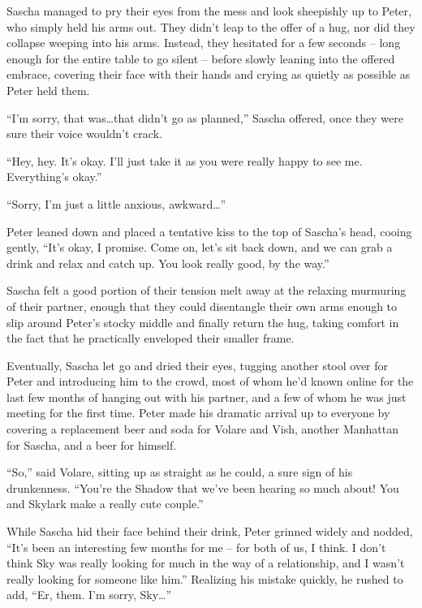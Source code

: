 \documentclass[12pt,letterpaper,oneside]{memoir}
\begin{document}
  Sascha managed to pry their eyes from the mess and look sheepishly up to Peter, who simply held his arms out. They didn't leap to the offer of a hug, nor did they collapse weeping into his arms. Instead, they hesitated for a few seconds -- long enough for the entire table to go silent -- before slowly leaning into the offered embrace, covering their face with their hands and crying as quietly as possible as Peter held them.

  ``I'm sorry, that was\ldots{}that didn't go as planned,'' Sascha offered, once they were sure their voice wouldn't crack.

  ``Hey, hey. It's okay. I'll just take it as you were really happy to see me. Everything's okay.''

  ``Sorry, I'm just a little anxious, awkward\ldots{}''

  Peter leaned down and placed a tentative kiss to the top of Sascha's head, cooing gently, ``It's okay, I promise. Come on, let's sit back down, and we can grab a drink and relax and catch up. You look really good, by the way.''

  Sascha felt a good portion of their tension melt away at the relaxing murmuring of their partner, enough that they could disentangle their own arms enough to slip around Peter's stocky middle and finally return the hug, taking comfort in the fact that he practically enveloped their smaller frame.

  Eventually, Sascha let go and dried their eyes, tugging another stool over for Peter and introducing him to the crowd, most of whom he'd known online for the last few months of hanging out with his partner, and a few of whom he was just meeting for the first time. Peter made his dramatic arrival up to everyone by covering a replacement beer and soda for Volare and Vish, another Manhattan for Sascha, and a beer for himself.

  ``So,'' said Volare, sitting up as straight as he could, a sure sign of his drunkenness. ``You're the Shadow that we've been hearing so much about! You and Skylark make a really cute couple.''

  While Sascha hid their face behind their drink, Peter grinned widely and nodded, ``It's been an interesting few months for me -- for both of us, I think. I don't think Sky was really looking for much in the way of a relationship, and I wasn't really looking for someone like him.'' Realizing his mistake quickly, he rushed to add, ``Er, them. I'm sorry, Sky\ldots{}''
\end{document}
